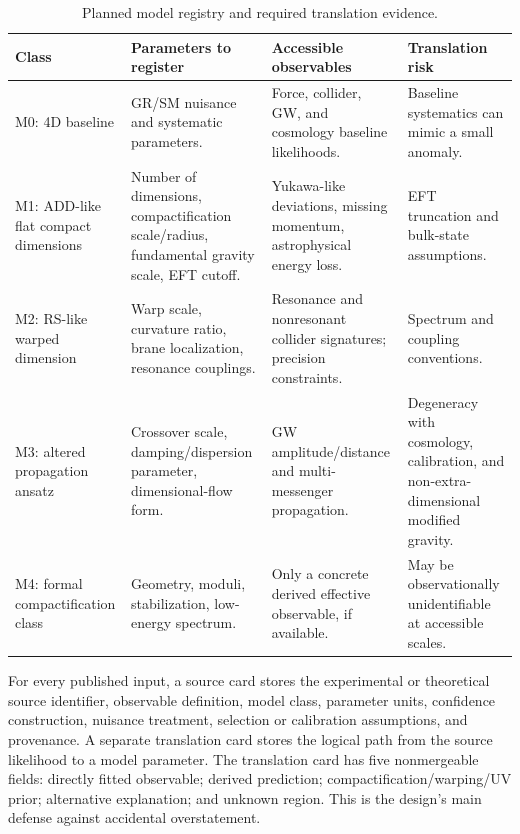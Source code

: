 \documentclass[conference]{IEEEtran}
\begin{document}
\begin{table}[t]
\caption{Planned model registry and required translation evidence.}
\label{tab:models}
\centering
\footnotesize
\setlength{\tabcolsep}{2.7pt}
\begin{tabular}{p{} p{} p{} p{}}
\toprule
\textbf{Class} & \textbf{Parameters to register} & \textbf{Accessible observables} & \textbf{Translation risk} \\
\midrule
M0: 4D baseline & GR/SM nuisance and systematic parameters. & Force, collider, GW, and cosmology baseline likelihoods. & Baseline systematics can mimic a small anomaly. \\
M1: ADD-like flat compact dimensions & Number of dimensions, compactification scale/radius, fundamental gravity scale, EFT cutoff. & Yukawa-like deviations, missing momentum, astrophysical energy loss. & EFT truncation and bulk-state assumptions. \\
M2: RS-like warped dimension & Warp scale, curvature ratio, brane localization, resonance couplings. & Resonance and nonresonant collider signatures; precision constraints. & Spectrum and coupling conventions. \\
M3: altered propagation ansatz & Crossover scale, damping/dispersion parameter, dimensional-flow form. & GW amplitude/distance and multi-messenger propagation. & Degeneracy with cosmology, calibration, and non-extra-dimensional modified gravity. \\
M4: formal compactification class & Geometry, moduli, stabilization, low-energy spectrum. & Only a concrete derived effective observable, if available. & May be observationally unidentifiable at accessible scales. \\
\bottomrule
\end{tabular}
\end{table}

For every published input, a source card stores the experimental or theoretical source identifier, observable definition, model class, parameter units, confidence construction, nuisance treatment, selection or calibration assumptions, and provenance. A separate translation card stores the logical path from the source likelihood to a model parameter. The translation card has five nonmergeable fields: directly fitted observable; derived prediction; compactification/warping/UV prior; alternative explanation; and unknown region. This is the design's main defense against accidental overstatement.
\end{document}
